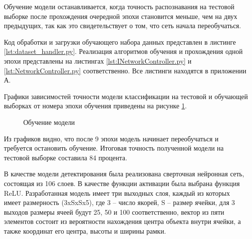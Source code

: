 Обучение модели останавливается, когда точность распознавания на тестовой выборке после прохождения очередной эпохи становится меньше, чем на двух предыдущих, так как это свидетельствует о том, что сеть начала переобучаться.

Код обработки и загрузки обучающего набора данных представлен в листинге \ref{lst:dataset_handler.py}. Реализация алгоритмов обучения и прохождения одной эпохи представлены на листингах \ref{lst:INetworkController.py} и \ref{lst:NetworkController.py} соответственно. Все листинги находятся в приложении А.

Графики зависимостей точности модели классификации на тестовой и обучающей выборках от номера эпохи обучения приведены на рисунке \ref{img:model_training}.

\begin{figure}[H]
	\begin{center}
		\caption{Обучение модели}
		\label{img:model_training}
	\end{center}
\end{figure}

Из графиков видно, что после 9 эпохи модель начинает переобучаться и требуется остановить обучение. Итоговая точность полученной модели на тестовой выборке составила 84 процента.

В качестве модели детектирования была реализована сверточная нейронная сеть, состоящая из 106 слоев. В качестве функции активации была выбрана функция ReLU. Разработанная модель имеет три выходных слоя, каждый из которых имеет размерность (3xSxSx5), где 3 -- число якорей, S -- размер ячейки, для 3 выходов размеры ячеей будут 25, 50 и 100 соответственно, вектор из пяти элементов состоит из вероятности нахождения центра объекта внутри ячейки, а также координат его центра, высоты и ширины рамки.

